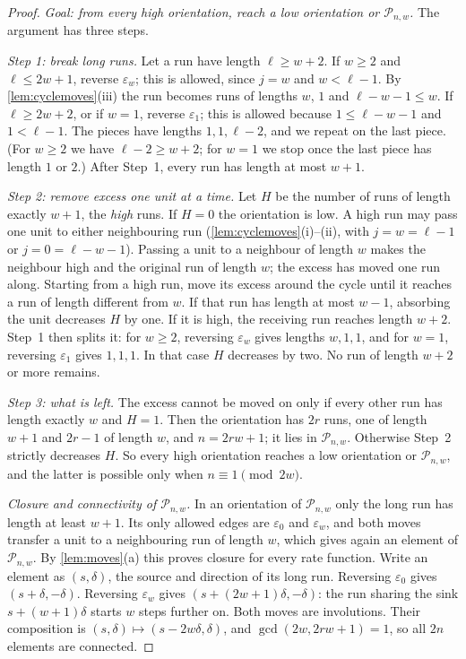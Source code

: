\documentclass[11pt,a4paper]{article}
\theoremstyle{plain}
\theoremstyle{plain}
\newcommand{\Pat}{\mathcal{P}}
\begin{document}
\begin{proof}
\emph{Goal: from every high orientation, reach a low orientation or $\Pat_{n,w}$.} The argument has three steps.

\emph{Step 1: break long runs.} Let a run have length $\ell\ge w+2$. If $w\ge2$ and $\ell\le2w+1$, reverse $\varepsilon_w$; this is allowed, since $j=w$ and $w<\ell-1$. By \cref{lem:cyclemoves}(iii) the run becomes runs of lengths $w$, $1$ and $\ell-w-1\le w$. If $\ell\ge2w+2$, or if $w=1$, reverse $\varepsilon_1$; this is allowed because $1\le\ell-w-1$ and $1<\ell-1$. The pieces have lengths $1,1,\ell-2$, and we repeat on the last piece. (For $w\ge2$ we have $\ell-2\ge w+2$; for $w=1$ we stop once the last piece has length $1$ or $2$.) After Step~1, every run has length at most $w+1$.

\emph{Step 2: remove excess one unit at a time.} Let $H$ be the number of runs of length exactly $w+1$, the \emph{high} runs. If $H=0$ the orientation is low. A high run may pass one unit to either neighbouring run (\cref{lem:cyclemoves}(i)--(ii), with $j=w=\ell-1$ or $j=0=\ell-w-1$). Passing a unit to a neighbour of length $w$ makes the neighbour high and the original run of length $w$; the excess has moved one run along. Starting from a high run, move its excess around the cycle until it reaches a run of length different from $w$. If that run has length at most $w-1$, absorbing the unit decreases $H$ by one. If it is high, the receiving run reaches length $w+2$. Step~1 then splits it: for $w\ge2$, reversing $\varepsilon_w$ gives lengths $w,1,1$, and for $w=1$, reversing $\varepsilon_1$ gives $1,1,1$. In that case $H$ decreases by two. No run of length $w+2$ or more remains.

\emph{Step 3: what is left.} The excess cannot be moved on only if every other run has length exactly $w$ and $H=1$. Then the orientation has $2r$ runs, one of length $w+1$ and $2r-1$ of length $w$, and $n=2rw+1$; it lies in $\Pat_{n,w}$. Otherwise Step~2 strictly decreases $H$. So every high orientation reaches a low orientation or $\Pat_{n,w}$, and the latter is possible only when $n\equiv1\pmod{2w}$.

\emph{Closure and connectivity of $\Pat_{n,w}$.} In an orientation of $\Pat_{n,w}$ only the long run has length at least $w+1$. Its only allowed edges are $\varepsilon_0$ and $\varepsilon_w$, and both moves transfer a unit to a neighbouring run of length $w$, which gives again an element of $\Pat_{n,w}$. By \cref{lem:moves}(a) this proves closure for every rate function. Write an element as $(s,\delta)$, the source and direction of its long run. Reversing $\varepsilon_0$ gives $(s+\delta,-\delta)$. Reversing $\varepsilon_w$ gives $(s+(2w+1)\delta,-\delta)$: the run sharing the sink $s+(w+1)\delta$ starts $w$ steps further on. Both moves are involutions. Their composition is $(s,\delta)\mapsto(s-2w\delta,\delta)$, and $\gcd(2w,2rw+1)=1$, so all $2n$ elements are connected.


\end{proof}
\end{document}
